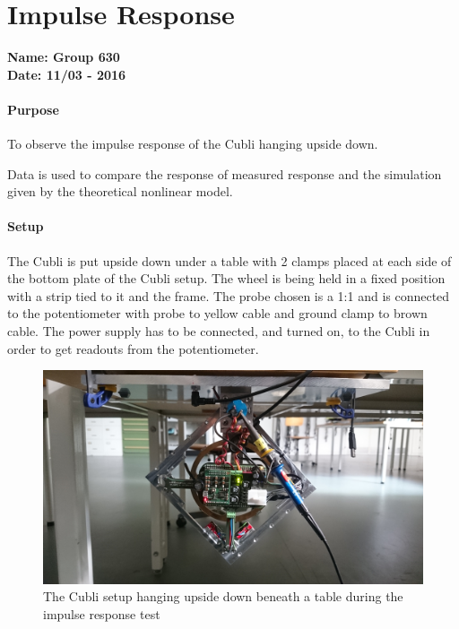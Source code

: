 \chapter{Impulse Response}\label{impulseTestAppendix} 
\textbf{Name: Group 630}\\
\textbf{Date: 11/03 - 2016}

\subsubsection{Purpose}
To observe the impulse response of the Cubli hanging upside down.

Data is used to compare the response of measured response and the simulation given by the theoretical nonlinear model.

\subsubsection{Setup}
The Cubli is put upside down under a table with 2 clamps placed at each side of the bottom plate of the Cubli setup.
The wheel is being held in a fixed position with a strip tied to it and the frame. The probe chosen is a 1:1 and is connected to the potentiometer with probe to yellow cable and ground clamp to brown cable. The power supply has to be connected, and turned on, to the Cubli in order to get readouts from the potentiometer.
\begin{figure}[H] 
	\centering 
	\includegraphics[scale=0.08]{figures/impulseResponseSetup}
	\caption{The Cubli setup hanging upside down beneath a table during the impulse response test}
	\label{impulseResponseTestPicture}
\end{figure} 

